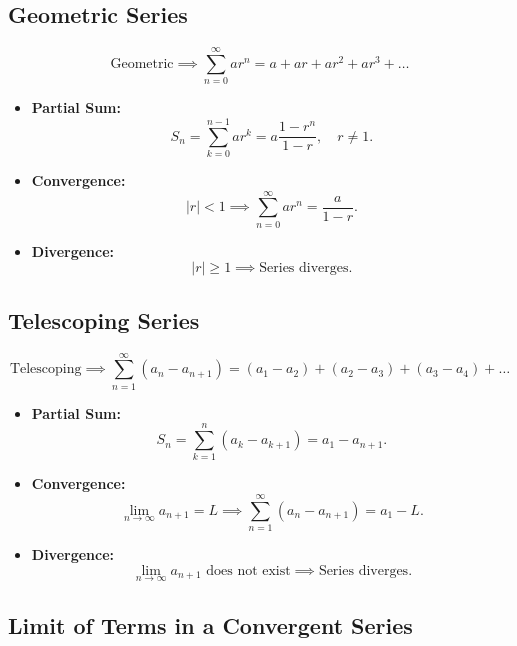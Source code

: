 \documentclass[a4paper,11pt]{article}
\theoremstyle{definition}
\theoremstyle{plain}
\theoremstyle{remark}
\begin{document}


\subsection{Geometric Series}

\begin{tcolorbox}
    \[
    \text{Geometric} \implies \sum_{n=0}^{\infty} ar^n = a + ar + ar^2 + ar^3 + \dots
    \]
    \begin{itemize}
        \item \textbf{Partial Sum:}
        \[ S_n = \sum_{k=0}^{n-1} ar^k = a \frac{1-r^n}{1-r}, \quad r\neq1. \]
        \item \textbf{Convergence:}
        \[ |r| < 1 \implies \sum_{n=0}^{\infty} ar^n = \frac{a}{1-r}. \]
        \item \textbf{Divergence:}
        \[ |r| \geq 1 \implies \text{Series diverges.} \]
    \end{itemize}
\end{tcolorbox}




\subsection{Telescoping Series}

\begin{tcolorbox}
    \[
    \text{Telescoping} \implies \sum_{n=1}^{\infty} (a_n - a_{n+1}) = (a_1 - a_2) + (a_2 - a_3) + (a_3 - a_4) + \dots
    \]
    \begin{itemize}
        \item \textbf{Partial Sum:}
        \[ S_n = \sum_{k=1}^{n} (a_k - a_{k+1}) = a_1 - a_{n+1}. \]
        \item \textbf{Convergence:}
        \[ \lim_{n \to \infty} a_{n+1} = L \implies \sum_{n=1}^{\infty} (a_n - a_{n+1}) = a_1-L. \]
        \item \textbf{Divergence:}
        \[ \lim_{n \to \infty} a_{n+1} \text{ does not exist} \implies \text{Series diverges.} \]
    \end{itemize}
\end{tcolorbox}




\subsection{Limit of Terms in a Convergent Series}
\end{document}
